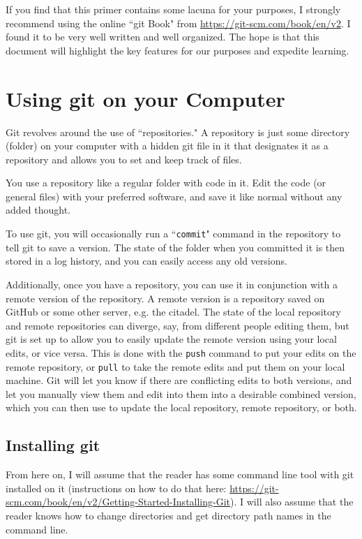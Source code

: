 \documentclass[11pt]{article}
\begin{document}
If you find that this primer contains some lacuna for your purposes, I strongly recommend using the online ``git Book" from \url{https://git-scm.com/book/en/v2}.  I found it to be very well written and well organized.  The hope is that this document will highlight the key features for our purposes and expedite learning.

\section{Using git on your Computer}

Git revolves around the use of ``repositories."  A repository is just some directory (folder) on your computer with a hidden git file in it that designates it as a repository and allows you to set and keep track of files.

You use a repository like a regular folder with code in it.  Edit the code (or general files) with your preferred software, and save it like normal without any added thought.

To use git, you will occasionally run a ``\texttt{commit}" command in the repository to tell git to save a version.  The state of the folder when you committed it is then stored in a log history, and you can easily access any old versions.

Additionally, once you have a repository, you can use it in conjunction with a remote version of the repository.  A remote version is a repository saved on GitHub or some other server, e.g. the citadel.  The state of the local repository and remote repositories can diverge, say, from different people editing them, but git is set up to allow you to easily update the remote version using your local edits, or vice versa.  This is done with the \texttt{push} command to put your edits on the remote repository, or \texttt{pull} to take the remote edits and put them on your local machine.  Git will let you know if there are conflicting edits to both versions, and let you manually view them and edit into them into a desirable combined version, which you can then use to update the local repository, remote repository, or both.

\subsection{Installing git}
From here on, I will assume that the reader has some command line tool with git installed on it (instructions on how to do that here: \newline\url{https://git-scm.com/book/en/v2/Getting-Started-Installing-Git}).  I will also assume that the reader knows how to change directories and get directory path names in the command line.
\end{document}
